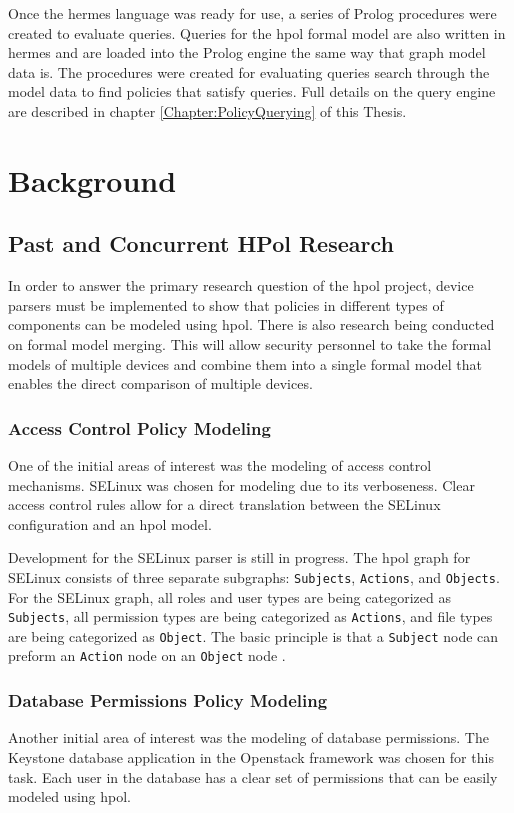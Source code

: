 \documentclass[12pt,letterpaper]{report}
\begin{document}
Once the \ac{hermes} language was ready for use, a series of Prolog procedures were created to evaluate queries. Queries for the \ac{hpol} formal model are also written in \ac{hermes} and are loaded into the Prolog engine the same way that graph model data is. The procedures were created for evaluating queries search through the model data to find policies that satisfy queries. Full details on the query engine are described in chapter \ref{Chapter:PolicyQuerying} of this Thesis.


\chapter{Background}
\label{Chapter:Background}

\section{Past and Concurrent HPol Research}
In order to answer the primary research question of the \ac{hpol} project, device parsers must be implemented to show that policies in different types of components can be modeled using \ac{hpol}. There is also research being conducted on formal model merging. This will allow security personnel to take the formal models of multiple devices and combine them into a single formal model that enables the direct comparison of multiple devices.

\subsection{Access Control Policy Modeling}
One of the initial areas of interest was the modeling of access control mechanisms. SELinux was chosen for modeling due to its verboseness. Clear access control rules allow for a direct translation between the SELinux configuration and an \ac{hpol} model. 

Development for the SELinux parser is still in progress. The \ac{hpol} graph for SELinux consists of three separate subgraphs: \texttt{Subjects}, \texttt{Actions}, and \texttt{Objects}. For the SELinux graph, all roles and user types are being categorized as \texttt{Subjects}, all permission types are being categorized as \texttt{Actions}, and file types are being categorized as \texttt{Object}. The basic principle is that a \texttt{Subject} node can preform an \texttt{Action} node on an \texttt{Object} node \cite{zook1}. 	

\subsection{Database Permissions Policy Modeling}
Another initial area of interest was the modeling of database permissions. The Keystone database application in the Openstack framework was chosen for this task. Each user in the database has a clear set of permissions that can be easily modeled using \ac{hpol}.
\end{document}
